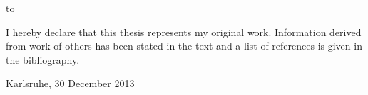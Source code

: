 \thispagestyle{empty}
\vspace*{0cm}
\vfill
\hbox to \textwidth{\hrulefill}
\par
I hereby declare that this thesis represents my original work.
Information derived from work of others has been stated in the text and a list of references is given in the bibliography.

Karlsruhe, 30 December 2013

\clearpage






